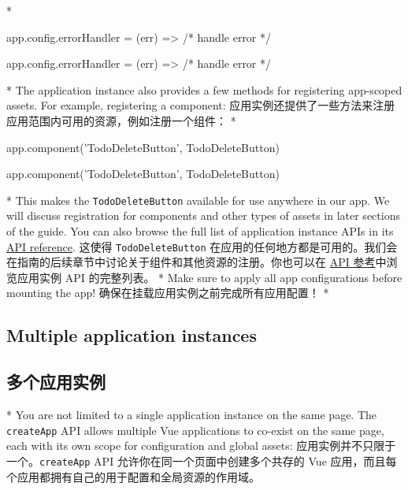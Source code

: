 \begin{paracol}{2}
\switchcolumn[0]*%
\begin{codeJs}
app.config.errorHandler = (err) => {
/* handle error */
}
\end{codeJs}
\switchcolumn
\begin{codeJs}
    app.config.errorHandler = (err) => {
/* handle error */
}
\end{codeJs}

\switchcolumn[0]*%
The application instance also provides a few methods for registering
app-scoped assets. For example, registering a component:
\switchcolumn
应用实例还提供了一些方法来注册应用范围内可用的资源，例如注册一个组件：
\switchcolumn[0]*%
\begin{codeJs}
app.component('TodoDeleteButton', TodoDeleteButton)
\end{codeJs}
\switchcolumn
\begin{codeJs}
app.component('TodoDeleteButton', TodoDeleteButton)
\end{codeJs}

\switchcolumn[0]*%
This makes the \texttt{TodoDeleteButton} available for use anywhere in
our app. We will discuss registration for components and other types of
assets in later sections of the guide. You can also browse the full list
of application instance APIs in its
\href{https://vuejs.org/api/application.html}{API reference}.
\switchcolumn
这使得 \texttt{TodoDeleteButton}
在应用的任何地方都是可用的。我们会在指南的后续章节中讨论关于组件和其他资源的注册。你也可以在
\href{https://cn.vuejs.org/api/application.html}{API 参考}中浏览应用实例
API 的完整列表。
\switchcolumn[0]*%
Make sure to apply all app configurations before mounting the app!
\switchcolumn
确保在挂载应用实例之前完成所有应用配置！
\switchcolumn[0]*%
\subsection{Multiple application instances}
\switchcolumn
\subsection{多个应用实例}
\switchcolumn[0]*%
You are not limited to a single application instance on the same page.
The \texttt{createApp} API allows multiple Vue applications to co-exist
on the same page, each with its own scope for configuration and global
assets:
\switchcolumn
应用实例并不只限于一个。\texttt{createApp} API
允许你在同一个页面中创建多个共存的 Vue
应用，而且每个应用都拥有自己的用于配置和全局资源的作用域。


\end{paracol}
